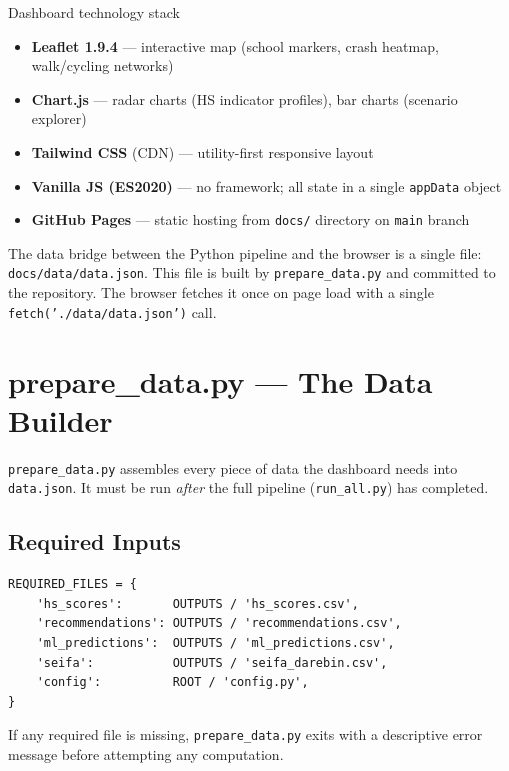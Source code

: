 \documentclass[11pt,a4paper,openany]{book}
\begin{document}
\begin{keybox}{Dashboard technology stack}
\begin{itemize}
  \item \textbf{Leaflet 1.9.4} --- interactive map (school markers, crash heatmap, walk/cycling networks)
  \item \textbf{Chart.js} --- radar charts (HS indicator profiles), bar charts (scenario explorer)
  \item \textbf{Tailwind CSS} (CDN) --- utility-first responsive layout
  \item \textbf{Vanilla JS (ES2020)} --- no framework; all state in a single \texttt{appData} object
  \item \textbf{GitHub Pages} --- static hosting from \texttt{docs/} directory on \texttt{main} branch
\end{itemize}
\end{keybox}

The data bridge between the Python pipeline and the browser is a single file:
\texttt{docs/data/data.json}.  This file is built by \texttt{prepare\_data.py} and
committed to the repository.  The browser fetches it once on page load with a single
\texttt{fetch('./data/data.json')} call.

\section{prepare\_data.py --- The Data Builder}

\texttt{prepare\_data.py} assembles every piece of data the dashboard needs into
\texttt{data.json}.  It must be run \emph{after} the full pipeline (\texttt{run\_all.py})
has completed.

\subsection{Required Inputs}

\begin{lstlisting}[style=python, caption={Required files checked at startup.}]
REQUIRED_FILES = {
    'hs_scores':       OUTPUTS / 'hs_scores.csv',
    'recommendations': OUTPUTS / 'recommendations.csv',
    'ml_predictions':  OUTPUTS / 'ml_predictions.csv',
    'seifa':           OUTPUTS / 'seifa_darebin.csv',
    'config':          ROOT / 'config.py',
}
\end{lstlisting}

If any required file is missing, \texttt{prepare\_data.py} exits with a descriptive
error message before attempting any computation.
\end{document}
